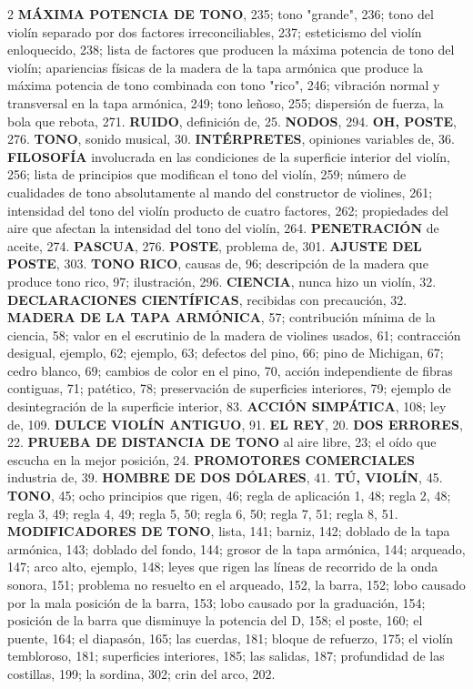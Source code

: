 \begin{multicols}{2}
\textbf{MÁXIMA POTENCIA DE TONO}, 235; tono "grande", 236; tono del violín separado por dos factores irreconciliables, 237; esteticismo del violín enloquecido, 238; lista de factores que producen la máxima potencia de tono del violín; apariencias físicas de la madera de la tapa armónica que produce la máxima potencia de tono combinada con tono "rico", 246; vibración normal y transversal en la tapa armónica, 249; tono leñoso, 255; dispersión de fuerza, la bola que rebota, 271.
\textbf{RUIDO}, definición de, 25.
\textbf{NODOS}, 294.
\textbf{OH, POSTE}, 276.
\textbf{TONO}, sonido musical, 30.
\textbf{INTÉRPRETES}, opiniones variables de, 36.
\textbf{FILOSOFÍA} involucrada en las condiciones de la superficie interior del violín, 256; lista de principios que modifican el tono del violín, 259; número de cualidades de tono absolutamente al mando del constructor de violines, 261; intensidad del tono del violín producto de cuatro factores, 262; propiedades del aire que afectan la intensidad del tono del violín, 264.
\textbf{PENETRACIÓN} de aceite, 274.
\textbf{PASCUA}, 276.
\textbf{POSTE}, problema de, 301.
\textbf{AJUSTE DEL POSTE}, 303.
\textbf{TONO RICO}, causas de, 96; descripción de la madera que produce tono rico, 97; ilustración, 296.
\textbf{CIENCIA}, nunca hizo un violín, 32.
\textbf{DECLARACIONES CIENTÍFICAS}, recibidas con precaución, 32.
\textbf{MADERA DE LA TAPA ARMÓNICA}, 57; contribución mínima de la ciencia, 58; valor en el escrutinio de la madera de violines usados, 61; contracción desigual, ejemplo, 62; ejemplo, 63; defectos del pino, 66; pino de Michigan, 67; cedro blanco, 69; cambios de color en el pino, 70, acción independiente de fibras contiguas, 71; patético, 78; preservación de superficies interiores, 79; ejemplo de desintegración de la superficie interior, 83.
\textbf{ACCIÓN SIMPÁTICA}, 108; ley de, 109.
\textbf{DULCE VIOLÍN ANTIGUO}, 91.
\textbf{EL REY}, 20.
\textbf{DOS ERRORES}, 22.
\textbf{PRUEBA DE DISTANCIA DE TONO} al aire libre, 23; el oído que escucha en la mejor posición, 24.
\textbf{PROMOTORES COMERCIALES} industria de, 39.
\textbf{HOMBRE DE DOS DÓLARES}, 41.
\textbf{TÚ, VIOLÍN}, 45.
\textbf{TONO}, 45; ocho principios que rigen, 46; regla de aplicación 1, 48; regla 2, 48; regla 3, 49; regla 4, 49; regla 5, 50; regla 6, 50; regla 7, 51; regla 8, 51.
\textbf{MODIFICADORES DE TONO}, lista, 141; barniz, 142; doblado de la tapa armónica, 143; doblado del fondo, 144; grosor de la tapa armónica, 144; arqueado, 147; arco alto, ejemplo, 148; leyes que rigen las líneas de recorrido de la onda sonora, 151; problema no resuelto en el arqueado, 152, la barra, 152; lobo causado por la mala posición de la barra, 153; lobo causado por la graduación, 154; posición de la barra que disminuye la potencia del D, 158; el poste, 160; el puente, 164; el diapasón, 165; las cuerdas, 181; bloque de refuerzo, 175; el violín tembloroso, 181; superficies interiores, 185; las salidas, 187; profundidad de las costillas, 199; la sordina, 302; crin del arco, 202.

\end{multicols}
